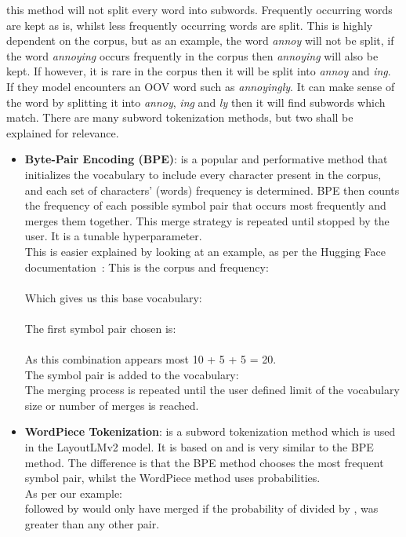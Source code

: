 \begin{itemize}
	      this method will not split every word into subwords. Frequently occurring words are kept as is, whilst less frequently occurring words
	      are split. This is highly dependent on the corpus, but as an example, the word \emph{annoy} will not be split, if the word \emph{annoying}
	      occurs frequently in the corpus then \emph{annoying} will also be kept. If however, it is rare in the corpus then it will be split
	      into \emph{annoy} and \emph{ing}. If they model encounters an OOV word such as \emph{annoyingly}. It can make sense of the word by splitting it
	      into \emph{annoy}, \emph{ing} and \emph{ly} then it will find subwords which match.
	      \bigbreak
	      There are many subword tokenization methods, but two shall be explained for relevance.
	      \begin{itemize}
		      \item \textbf{Byte-Pair Encoding (BPE)}: is a popular and performative method that initializes the vocabulary to include
		            every character present in the corpus, and each set of characters' (words) frequency is determined.
		            BPE then counts the frequency of each possible symbol pair that occurs most frequently and merges
		            them together. This merge strategy is repeated until stopped by the user. It is a tunable hyperparameter.\\
		            This is easier explained by looking at an example, as per the Hugging Face documentation~\autocite{SummaryTokenizers}:
		            \bigbreak
		            This is the corpus and frequency:\\
		            \\
		            Which gives us this base vocabulary:\\
		            \code{["b", "g", "h", "n", "p", "s", "u"]}\\
		            The first symbol pair chosen is: \\
		            \\
		            As this combination appears most 10 + 5 + 5 = 20.\\
		            The symbol pair is added to the vocabulary: \\
		            \code{["b", "g", "h", "n", "p", "s", "u", "ug"]}
		            \bigbreak
		            The merging process is repeated until the user defined limit of the vocabulary size or number of merges is reached.
		      \item \textbf{WordPiece Tokenization}: is a subword tokenization method which is used in the LayoutLMv2 model. It is based on and is very similar to
		            the BPE method. The difference is that the BPE method chooses the most frequent symbol pair, whilst the WordPiece method uses probabilities.\\
		            As per our example:\\
		             followed by  would only have merged if the probability of  divided by ,  was greater
		            than any other pair.
	      \end{itemize}
\end{itemize}
